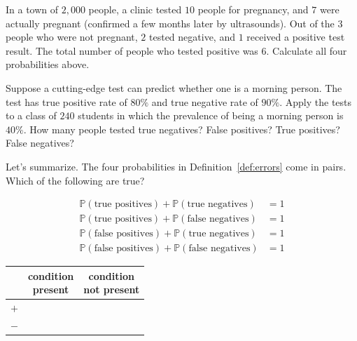 \documentclass[../main.tex]{subfiles}
\begin{document}
\begin{example} \label{ex:errors-pregnancy-test}
  In a town of \(2,000\) people, a clinic tested \(10\) people for pregnancy, and \(7\) were actually pregnant (confirmed a few months later by ultrasounds).  Out of the \(3\) people who were not pregnant, \(2\) tested negative, and \(1\) received a positive test result.  The total number of people who tested positive was \(6\). Calculate all four probabilities above.

\end{example}

\begin{example} \label{ex:errors-morning-person}
  Suppose a cutting-edge test can predict whether one is a morning person. The test has true positive rate of \(80\%\) and true negative rate of \(90\%\).
  Apply the tests to a class of \(240\) students in which the prevalence of being a morning person is \(40\%\).  How many people tested true negatives? False positives? True positives? False negatives?

  \blanks*
\end{example}

\clearpage
Let's summarize. The four probabilities in Definition~\ref{def:errors} come in pairs. Which of the following are true?

\bigskip
\begin{minipage}{3.5in}
  \begin{align*}
    \mathbb{P}(\text{true positives}) + \mathbb{P}(\text{true negatives}) &= 1 \\[3ex]
    \mathbb{P}(\text{true positives}) + \mathbb{P}(\text{false negatives}) &= 1 \\[3ex]
    \mathbb{P}(\text{false positives}) + \mathbb{P}(\text{true negatives}) &= 1 \\[3ex]
    \mathbb{P}(\text{false positives}) + \mathbb{P}(\text{false negatives}) &= 1
  \end{align*}
\end{minipage}
\begin{minipage}{3.5in}
  \begin{center}
    \begin{tabular}{c||c|c}
      & \parbox{1.25in}{\centering condition\\present} & \parbox{1.25in}{\centering condition\\not present} \\\midrule\midrule
      \(+\) &                                             & \\[3ex]\midrule
      \(-\) &                                             & \\[3ex]
    \end{tabular}
  \end{center}
\end{minipage}
\end{document}
